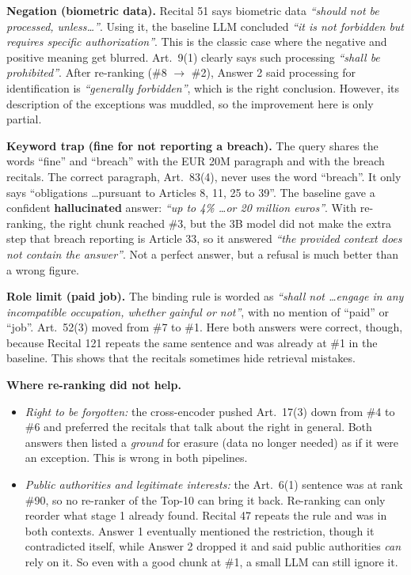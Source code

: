 \documentclass[11pt]{article}
\newcommand{\ans}[1]{\textit{``#1''}}
\begin{document}
\textbf{Negation (biometric data).} Recital 51 says biometric data \ans{should not be processed, unless\ldots}.
Using it, the baseline LLM concluded \ans{it is not forbidden but requires specific authorization}. This is the
classic case where the negative and positive meaning get blurred. Art.\ 9(1) clearly says such processing
\ans{shall be prohibited}. After re-ranking (\#8 $\to$ \#2), Answer 2 said processing for identification is
\ans{generally forbidden}, which is the right conclusion. However, its description of the exceptions was muddled,
so the improvement here is only partial.

\textbf{Keyword trap (fine for not reporting a breach).} The query shares the words ``fine'' and ``breach'' with the
EUR 20M paragraph and with the breach recitals. The correct paragraph, Art.\ 83(4), never uses the word ``breach''.
It only says ``obligations \ldots pursuant to Articles 8, 11, 25 to 39''. The baseline gave a confident
\textbf{hallucinated} answer: \ans{up to 4\% \ldots or 20 million euros}. With re-ranking, the right chunk reached \#3,
but the 3B model did not make the extra step that breach reporting is Article 33, so it answered \ans{the provided
context does not contain the answer}. Not a perfect answer, but a refusal is much better than a wrong figure.

\textbf{Role limit (paid job).} The binding rule is worded as \ans{shall not \ldots engage in any incompatible
occupation, whether gainful or not}, with no mention of ``paid'' or ``job''. Art.\ 52(3) moved from \#7 to \#1.
Here both answers were correct, though, because Recital 121 repeats the same sentence and was already at \#1 in the
baseline. This shows that the recitals sometimes hide retrieval mistakes.

\textbf{Where re-ranking did not help.}
\begin{itemize}
  \item \emph{Right to be forgotten:} the cross-encoder pushed Art.\ 17(3) down from \#4 to \#6 and preferred the recitals
  that talk about the right in general. Both answers then listed a \emph{ground} for erasure (data no longer needed)
  as if it were an exception. This is wrong in both pipelines.
  \item \emph{Public authorities and legitimate interests:} the Art.\ 6(1) sentence was at rank \#90, so no re-ranker of
  the Top-10 can bring it back. Re-ranking can only reorder what stage 1 already found. Recital 47 repeats the rule and was
  in both contexts. Answer 1 eventually mentioned the restriction, though it contradicted itself, while Answer 2 dropped
  it and said public authorities \emph{can} rely on it. So even with a good chunk at \#1, a small LLM can still ignore it.
\end{itemize}
\end{document}
